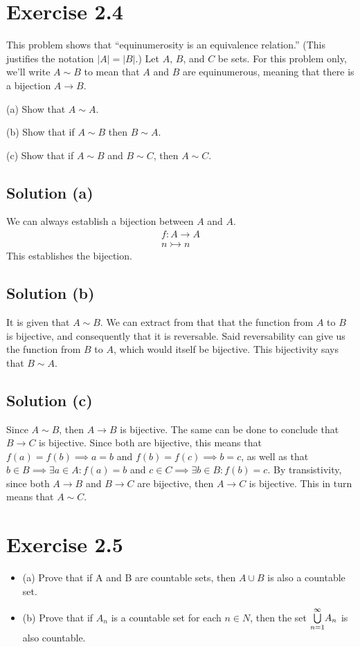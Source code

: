 \documentclass[12pt]{report}
\begin{document}
\pagebreak
\section{Exercise 2.4}
This problem shows that ``equinumerosity is an equivalence relation.'' (This justifies the notation $|A| = |B|$.) Let $A$, $B$, and $C$ be sets. For this problem only, we'll write $A \sim B$ to mean that $A$ and $B$ are equinumerous, meaning that there is a bijection $A \to B$. 

(a) Show that $A \sim A$.  

(b) Show that if $A \sim B$ then $B \sim A$.  

(c) Show that if $A \sim B$ and $B \sim C$, then $A \sim C$. 

\subsection{Solution (a)}
We can always establish a bijection between $A$ and $A$.
\begin{gather}
    f: A \to A \\
    n \rightarrowtail n
\end{gather}
This establishes the bijection. 

\subsection{Solution (b)}
It is given that $A \sim B$. 
We can extract from that that the function from $A$ to $B$ is bijective, and consequently that it is reversable.
Said reversability can give us the function from $B$ to $A$, which would itself be bijective. 
This bijectivity says that $B \sim A$. 

\subsection{Solution (c)}
Since $A \sim B$, then $A \to B$ is bijective.
The same can be done to conclude that $B \to C$ is bijective.
Since both are bijective, this means that $f(a) = f(b) \implies a = b$ and $f(b) = f(c) \implies b = c$, as well as that $b \in B \implies \exists a \in A : f(a) = b$ and $c \in C \implies \exists b \in B : f(b) = c$.
By transistivity, since both $A \to B$ and $B \to C$ are bijective, then $A \to C$ is bijective.
This in turn means that $A \sim C$.

\pagebreak
\section{Exercise 2.5}
\begin{itemize}
    \item (a) Prove that if A and B are countable sets, then $A \cup B$ is also a countable set.  
    
    \item (b) Prove that if $A_n$ is a countable set for each $n \in N$, then the set  $\overunderset{\infty}{n = 1}{\bigcup} A_n$ is also countable. 
\end{itemize}
\end{document}
